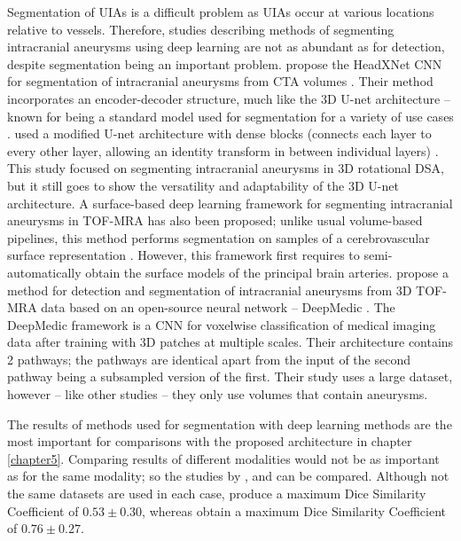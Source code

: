 Segmentation of UIAs is a difficult problem as UIAs occur at various locations relative to vessels. Therefore, studies describing methods of segmenting intracranial aneurysms using deep learning are not as abundant as for detection, despite segmentation being an important problem. \citeauthor{Park2019} propose the HeadXNet CNN for segmentation of intracranial aneurysms from CTA volumes \cite{Park2019}. Their method incorporates an encoder-decoder structure, much like the 3D U-net architecture -- known for being a standard model used for segmentation for a variety of use cases \cite{3dunet}. \citeauthor{Liu2021} used a modified U-net architecture with dense blocks (connects each layer to every other layer, allowing an identity transform in between individual layers) \cite{Liu2021}. This study focused on segmenting intracranial aneurysms in 3D rotational DSA, but it still goes to show the versatility and adaptability  of the 3D U-net architecture. A surface-based deep learning framework for segmenting intracranial aneurysms in TOF-MRA has also been proposed; unlike usual volume-based pipelines, this method performs segmentation on samples of a cerebrovascular surface representation \cite{Yang2020}. However, this framework first requires to semi-automatically obtain the surface models of the principal brain arteries. \citeauthor{Sichermann2019} propose a method for detection and segmentation of intracranial aneurysms from 3D TOF-MRA data based on an open-source neural network --  DeepMedic \cite{Sichermann2019}. The DeepMedic framework is a CNN for voxelwise classification of medical imaging data after training with 3D patches at multiple scales. Their architecture contains 2 pathways; the pathways are identical apart from the input of the second pathway being a subsampled version of the first. Their study uses a large dataset, however -- like other studies -- they only use volumes that contain aneurysms. 

The results of methods used for segmentation with deep learning methods are the most important for comparisons with the proposed architecture in chapter \ref{chapter5}. Comparing results of different modalities would not be as important as for the same modality; so the studies by \citeauthor{Yang2020}, and \citeauthor{Sichermann2019} can be compared. Although not the same datasets are used in each case, \citeauthor{Sichermann2019} produce a maximum Dice Similarity Coefficient of $0.53 \pm 0.30$, whereas \citeauthor{Yang2020} obtain a maximum Dice Similarity Coefficient of $0.76 \pm 0.27$.


